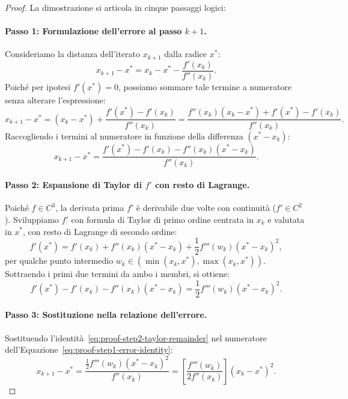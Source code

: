 \begin{proof}
La dimostrazione si articola in cinque passaggi logici:

\paragraph{Passo 1: Formulazione dell'errore al passo $k+1$.}
Consideriamo la distanza dell'iterato $x_{k+1}$ dalla radice $x^*$:
\begin{equation}
    x_{k+1} - x^* = x_k - x^* - \frac{f'(x_k)}{f''(x_k)}.
\end{equation}
Poich\'e per ipotesi $f'(x^*) = 0$, possiamo sommare tale termine a numeratore senza alterare l'espressione:
\begin{equation}
    x_{k+1} - x^* = (x_k - x^*) + \frac{f'(x^*) - f'(x_k)}{f''(x_k)} = \frac{f''(x_k)(x_k - x^*) + f'(x^*) - f'(x_k)}{f''(x_k)}.
\end{equation}
Raccogliendo i termini al numeratore in funzione della differenza $(x^* - x_k)$:
\begin{equation}
    x_{k+1} - x^* = \frac{f'(x^*) - f'(x_k) - f''(x_k)(x^* - x_k)}{f''(x_k)}.
    \label{eq:proof-step1-error-identity}
\end{equation}

\paragraph{Passo 2: Espansione di Taylor di $f'$ con resto di Lagrange.}
Poich\'e $f \in C^3$, la derivata prima $f'$ \`e derivabile due volte con continuit\`a ($f' \in C^2$). Sviluppiamo $f'$ con formula di Taylor di primo ordine centrata in $x_k$ e valutata in $x^*$, con resto di Lagrange di secondo ordine:
\begin{equation}
    f'(x^*) = f'(x_k) + f''(x_k)(x^* - x_k) + \frac{1}{2} f'''(w_k) (x^* - x_k)^2,
\end{equation}
per qualche punto intermedio $w_k \in ( \min(x_k, x^*), \max(x_k, x^*) )$.
Sottraendo i primi due termini da ambo i membri, si ottiene:
\begin{equation}
    f'(x^*) - f'(x_k) - f''(x_k)(x^* - x_k) = \frac{1}{2} f'''(w_k) (x^* - x_k)^2.
    \label{eq:proof-step2-taylor-remainder}
\end{equation}

\paragraph{Passo 3: Sostituzione nella relazione dell'errore.}
Sostituendo l'identit\`a~\eqref{eq:proof-step2-taylor-remainder} nel numeratore dell'Equazione~\eqref{eq:proof-step1-error-identity}:
\begin{equation}
    x_{k+1} - x^* = \frac{\frac{1}{2} f'''(w_k) (x^* - x_k)^2}{f''(x_k)} = \left[ \frac{f'''(w_k)}{2 f''(x_k)} \right] (x_k - x^*)^2.
    \label{eq:proof-step3-bracketed-relation}
\end{equation}


\end{proof}
